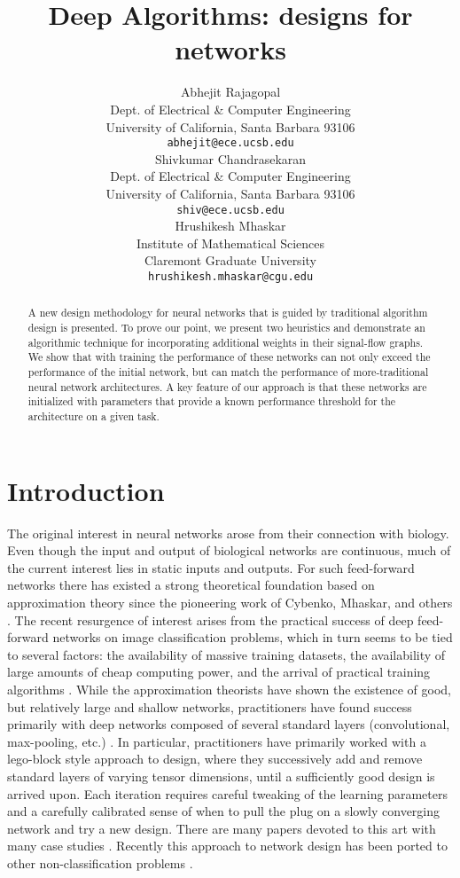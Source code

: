 \documentclass{article}
\title{Deep Algorithms: designs for networks}
\author{
  Abhejit Rajagopal \\ %
  Dept. of Electrical \& Computer Engineering\\
  University of California, Santa Barbara 93106\\
  \texttt{abhejit@ece.ucsb.edu} \\
   \And
   Shivkumar Chandrasekaran \\
   Dept. of Electrical \& Computer Engineering \\
   University of California, Santa Barbara 93106 \\
   \texttt{shiv@ece.ucsb.edu} \\
   \AND
    Hrushikesh Mhaskar \\
    Institute of Mathematical Sciences \\
    Claremont Graduate University \\
    \texttt{hrushikesh.mhaskar@cgu.edu}
}
\begin{document}

\maketitle

\begin{abstract}
    A new design methodology for neural networks that is guided by traditional algorithm design is presented. To prove our point, we present two heuristics and demonstrate an algorithmic technique for incorporating additional weights in their signal-flow graphs. We show that with training the performance of these networks can not only exceed the performance of the initial network, but can match the performance of more-traditional neural network architectures. A key feature of our approach is that these networks are initialized with parameters that provide a known performance threshold for the architecture on a given task.
\end{abstract}

\section{Introduction}
The original interest in neural networks arose from their connection with biology. Even though the input and output of biological networks are continuous, much of the current interest lies in static inputs and outputs. For such feed-forward networks there has existed a strong theoretical foundation based on approximation theory since the pioneering work of Cybenko, Mhaskar, and others \cite{cybenko1989approximation,mhaskar1992approximation,chui2016deep}. The recent resurgence of interest arises from the practical success of deep feed-forward networks on image classification problems, which in turn seems to be tied to several factors: the availability of massive training datasets, the availability of large amounts of cheap computing power, and the arrival of practical training algorithms \cite{rumelhart1986learning,taylor2010convolutional}. While the approximation theorists have shown the existence of good, but relatively large and shallow networks, practitioners have found success primarily with deep networks composed of several standard layers (convolutional, max-pooling, etc.) \cite{suzuki1998constructive,hornik1991approximation}. In particular, practitioners have primarily worked with a lego-block style approach to design, where they successively add and remove standard layers of varying tensor dimensions, until a sufficiently good design is arrived upon. Each iteration requires careful tweaking of the learning parameters and a carefully calibrated sense of when to pull the plug on a slowly converging network and try a new design. There are many papers devoted to this art with many case studies \cite{haykin2004comprehensive}. Recently this approach to network design has been ported to other non-classification problems \cite{kim2018communication}.
\end{document}
